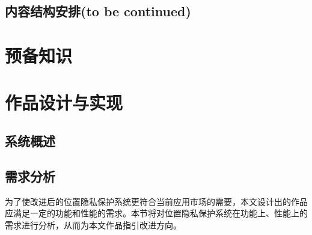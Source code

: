 \documentclass[zihao=-4]{ctexart}
\begin{document}
\subsection{内容结构安排(to be continued)}

\section{预备知识}


\section{作品设计与实现}
\subsection{系统概述}

\subsection{需求分析}
为了使改进后的位置隐私保护系统更符合当前应用市场的需要，本文设计出的作品应满足一定的功能和性能的需求。本节将对位置隐私保护系统在功能上、性能上的需求进行分析，从而为本文作品指引改进方向。
\end{document}
